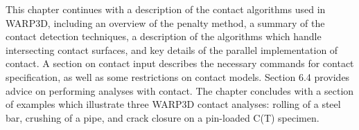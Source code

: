\documentclass[11pt]{report}
\numberwithin{equation}{section}
\begin{document}
This chapter continues with a description of the contact algorithms used in WARP3D, 
including an overview of the penalty method, a summary of the contact detection techniques, 
a description of the algorithms which handle intersecting contact surfaces, and key 
details of the parallel implementation of contact. A section on contact input describes 
the necessary commands for contact specification, as well as some restrictions on 
contact models. Section 6.4 provides advice on performing analyses with contact. 
The chapter concludes with a section of examples which illustrate three WARP3D 
contact analyses: rolling of a steel bar, crushing of a pipe, and crack closure on a 
pin-loaded C(T) specimen.
\end{document}
